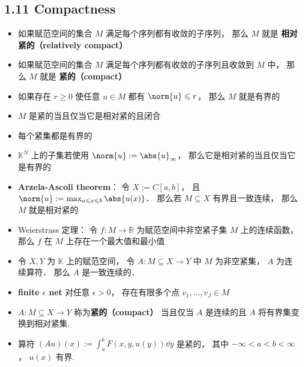 \subsection{1.11 Compactness}
\begin{itemize}
\item 如果赋范空间的集合 $M$ 满足每个序列都有收敛的子序列， 那么 $M$ 就是 \textbf{相对紧的（relatively compact）}

\item 如果赋范空间的集合 $M$ 满足每个序列都有收敛的子序列且收敛到 $M$ 中， 那么 $M$ 就是 \textbf{紧的（compact）}

\item 如果存在 $r \geqslant 0$ 使任意 $u \in M$ 都有 $\norm{u} \leqslant r$， 那么 $M$ 就是有界的

\item $M$ 是紧的当且仅当它是相对紧的且闭合

\item 每个紧集都是有界的

\item $\mathbb K^N$ 上的子集若使用 $\norm{u} := \abs{u}_\infty$， 那么它是相对紧的当且仅当它是有界的

\item \textbf{Arzela-Ascoli theorem}： 令 $X := C[a, b]$， 且 $\norm{u} := \max_{a\leqslant x\leqslant b}\abs{u(x)}$． 那么若 $M \subseteq X$ 有界且一致连续， 那么 $M$ 就是相对紧的

\item Weierstrass 定理： 令 $f: M\to \mathbb R$ 为赋范空间中非空紧子集 $M$ 上的连续函数， 那么 $f$ 在 $M$ 上存在一个最大值和最小值

\item 令 $X, Y$ 为 $\mathbb K$ 上的赋范空间， 令 $A: M \subseteq X \to Y$ 中 $M$ 为非空紧集， $A$ 为连续算符． 那么 $A$ 是一致连续的．

\item \textbf{finite $\epsilon$ net} 对任意 $\epsilon > 0$， 存在有限多个点 $v_1, \dots, v_J \in M$ 

\item $A: M \subseteq X \to Y$ 称为\textbf{紧的（compact）} 当且仅当 $A$ 是连续的且 $A$ 将有界集变换到相对紧集.

\item 算符 $(Au)(x) := \int_a^b F(x, y, u(y)) \dd{y}$ 是紧的， 其中 $-\infty < a < b < \infty$， $u(x)$ 有界.
\end{itemize}

